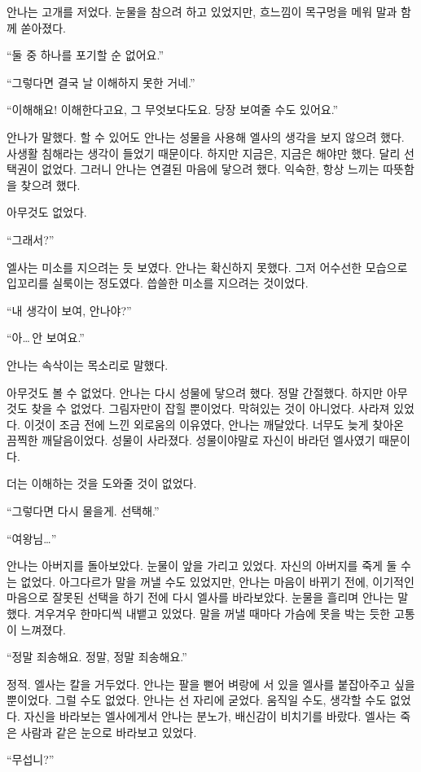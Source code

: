 안나는 고개를 저었다. 눈물을 참으려 하고 있었지만, 흐느낌이 목구멍을 메워 말과 함께 쏟아졌다.

``둘 중 하나를 포기할 순 없어요.''

``그렇다면 결국 날 이해하지 못한 거네.''

``이해해요! 이해한다고요, 그 무엇보다도요. 당장 보여줄 수도 있어요.''

안나가 말했다. 할 수 있어도 안나는 성물을 사용해 엘사의 생각을 보지 않으려 했다. 사생활 침해라는 생각이 들었기 때문이다. 하지만 지금은, 지금은 해야만 했다. 달리 선택권이 없었다. 그러니 안나는 연결된 마음에 닿으려 했다. 익숙한, 항상 느끼는 따뜻함을 찾으려 했다.

아무것도 없었다.

``그래서?''

엘사는 미소를 지으려는 듯 보였다. 안나는 확신하지 못했다. 그저 어수선한 모습으로 입꼬리를 실룩이는 정도였다. 씁쓸한 미소를 지으려는 것이었다.

``내 생각이 보여, 안나야?''

``아\ldots\,안 보여요.''

안나는 속삭이는 목소리로 말했다.

아무것도 볼 수 없었다. 안나는 다시 성물에 닿으려 했다. 정말 간절했다. 하지만 아무것도 찾을 수 없었다. 그림자만이 잡힐 뿐이었다. 막혀있는 것이 아니었다. 사라져 있었다. 이것이 조금 전에 느낀 외로움의 이유였다, 안나는 깨달았다. 너무도 늦게 찾아온 끔찍한 깨달음이었다. 성물이 사라졌다. 성물이야말로 자신이 바라던 엘사였기 때문이다.

더는 이해하는 것을 도와줄 것이 없었다.

``그렇다면 다시 물을게. 선택해.''

``여왕님\ldots''

안나는 아버지를 돌아보았다. 눈물이 앞을 가리고 있었다. 자신의 아버지를 죽게 둘 수는 없었다. 아그다르가 말을 꺼낼 수도 있었지만, 안나는 마음이 바뀌기 전에, 이기적인 마음으로 잘못된 선택을 하기 전에 다시 엘사를 바라보았다. 눈물을 흘리며 안나는 말했다. 겨우겨우 한마디씩 내뱉고 있었다. 말을 꺼낼 때마다 가슴에 못을 박는 듯한 고통이 느껴졌다.

``정말 죄송해요. 정말, 정말 죄송해요.''

정적. 엘사는 칼을 거두었다. 안나는 팔을 뻗어 벼랑에 서 있을 엘사를 붙잡아주고 싶을 뿐이었다. 그럴 수도 없었다. 안나는 선 자리에 굳었다. 움직일 수도, 생각할 수도 없었다. 자신을 바라보는 엘사에게서 안나는 분노가, 배신감이 비치기를 바랐다. 엘사는 죽은 사람과 같은 눈으로 바라보고 있었다.

``무섭니?''

